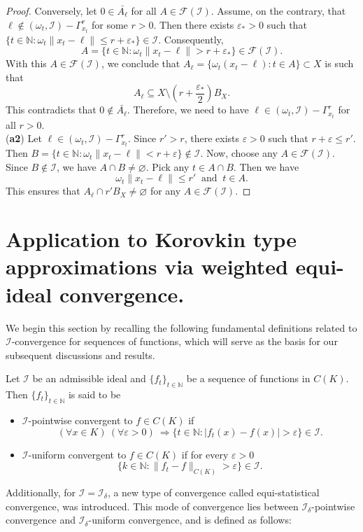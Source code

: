 \documentclass[reqno]{amsart}
\begin{document}
{\begin{proposition}
\begin{proof}
Conversely, let $0\in \bar{A_{\ell}}$ for all $A\in\mathcal{F}(\mathcal{I})$. Assume, on the contrary, that $\ell\notin (\omega_t,\mathcal{I})-\Gamma_{x_t}^r$ for some $r>0$. Then there exists $\varepsilon_*>0$ such that $\{t\in\mathbb{N}:\omega_t\|x_t-\ell\|\leq r+\varepsilon_*\}\in\mathcal{I}$. Consequently, 
$$
A=\{t\in\mathbb{N}:\omega_t\|x_t-\ell\|> r+\varepsilon_*\}\in\mathcal{F}(\mathcal{I}).
$$
With this $A\in\mathcal{F}(\mathcal{I})$, we conclude that $A_{\ell}=\{\omega_t(x_t-\ell):t\in A\}\subset X$ is such that 
$$
A_{\ell}\subseteq X\setminus (r+ \frac{\varepsilon_*}{2})B_X.
$$
This contradicts that $0\notin \bar{A_{\ell}}$. Therefore, we need to have $\ell\in (\omega_t,\mathcal{I})-\Gamma_{x_t}^r$ for all $r>0$.\\
(\textbf{a2}) Let $\ell\in (\omega_t,\mathcal{I})-\Gamma_{x_t}^r$. Since $r'>r$, there exists $\varepsilon>0$ such that $r+\varepsilon\leq r'$. Then $B=\{t\in\mathbb{N}:\omega_t\|x_t-\ell\|<r+\varepsilon\}\notin\mathcal{I}$. Now, choose any $A\in\mathcal{F}(\mathcal{I})$. Since $B\notin\mathcal{I}$, we have $A\cap B\neq\varnothing$. Pick any $t\in A\cap B$. Then we have  
$$
\omega_t\|x_t-\ell\|\leq r'~\mbox{ and }~t\in A.
$$
This ensures that $A_{\ell}\cap r'B_X\neq\varnothing$ for any $A\in\mathcal{F}(\mathcal{I})$.
\end{proof}
\end{proposition}

\section {Application to Korovkin type approximations via weighted equi-ideal convergence.}\label{section 5}

We begin this section by recalling the following fundamental definitions related to 
$\mathcal{I}$-convergence for sequences of functions, which will serve as the basis for our subsequent discussions and results.


\begin{definition}\cite[Section 2]{balcerzak2007statistical}
Let $\mathcal{I}$ be an admissible ideal and $\{f_t\}_{t\in\mathbb{N}}$ be a sequence of functions in $C(K)$. Then $\{f_t\}_{t\in\mathbb{N}}$ is said to be 
\begin{itemize}
\item[(i)] $\mathcal{I}$-pointwise convergent to $f\in C(K)$ if 
$$
(\forall x\in K)~(\forall \varepsilon>0)~\Rightarrow \{t\in\mathbb{N}:|f_t(x)-f(x)|> \varepsilon\}\in\mathcal{I}.
$$
\item [(ii)]$\mathcal{I}$-uniform convergent to $f\in C(K)$ if for every $\varepsilon>0$
$$
\{k\in\mathbb{N}:\|f_t-f\|_{C(K)}>\varepsilon\}\in\mathcal{I}.
$$
\end{itemize}
Additionally, for $\mathcal{I} = \mathcal{I}_\delta$, a new type of convergence called equi-statistical convergence, was introduced. This mode of convergence lies between $\mathcal{I}_\delta$-pointwise convergence and $\mathcal{I}_\delta$-uniform convergence, and is defined as follows:


\end{definition}}
\end{document}
